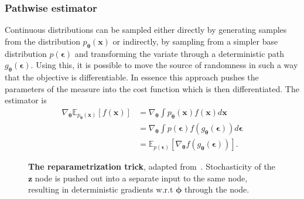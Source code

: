 \subsubsection{Pathwise estimator}
Continuous distributions can be sampled either directly by generating samples from the distribution $p_{\boldsymbol{\theta}}(\mathbf{x})$ or indirectly, by sampling from a simpler base distribution $p(\boldsymbol{\epsilon})$ and transforming the variate through a deterministic path $g_{\boldsymbol{\theta}}(\boldsymbol{\epsilon})$. Using this, it is possible to move the source of randomness in such a way that the objective is differentiable. In essence this approach pushes the parameters of the measure into the cost function which is then differentiated. The estimator is
\begin{equation}
\begin{aligned}
\nabla_{\boldsymbol{\theta}} \mathbb{E}_{p_{\boldsymbol{\theta}}(\mathbf{x})}[f(\mathbf{x})] 
&=\nabla_{\boldsymbol{\theta}} \int p_{\boldsymbol{\theta}}(\mathbf{x}) f(\mathbf{x}) d \mathbf{x} \\
&= \nabla_{\boldsymbol{\theta}} \int p(\boldsymbol{\epsilon}) f(g_{\boldsymbol{\theta}}(\boldsymbol{\epsilon})) d \boldsymbol{\epsilon} \\
&= \mathbb{E}_{p(\boldsymbol{\epsilon})}\left[\nabla_{\boldsymbol{\theta}} f(g_{\boldsymbol{\theta}}(\boldsymbol{\epsilon}))\right].
\end{aligned}
\end{equation}
\begin{figure}
	\centering
	\quad
	\caption[The reparametrization trick]{\textbf{The reparametrization trick}, adapted from~\cite{kingma2017variational}. Stochasticity of the $\mathbf{z}$ node is pushed out into a separate input to the same node, resulting in deterministic gradients w.r.t $\boldsymbol{\phi}$ through the node.}
	\label{fig:reparam}
\end{figure}
